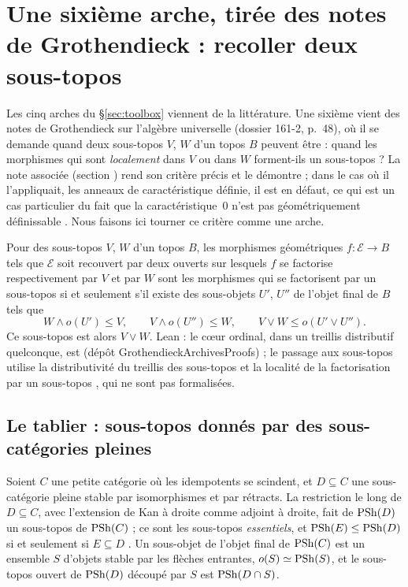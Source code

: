\section{Une sixième arche, tirée des notes de Grothendieck : recoller deux sous-topos}\label{sec:gluing}

Les cinq arches du \S\ref{sec:toolbox} viennent de la littérature. Une sixième vient des notes de Grothendieck sur l'algèbre universelle (dossier 161-2, p.~48), où il se demande quand deux sous-topos $V$, $W$ d'un topos $B$ peuvent être  : quand les morphismes qui sont \emph{localement} dans $V$ ou dans $W$ forment-ils un sous-topos ? La note associée \cite{bridges-notes} (section ) rend son critère précis et le démontre ; dans le cas où il l'appliquait, les anneaux de caractéristique définie, il est en défaut, ce qui est un cas particulier du fait que la caractéristique~$0$ n'est pas géométriquement définissable \cite[\S8.2]{caramello-flat}. Nous faisons ici tourner ce critère comme une arche.

\begin{bridge}[Recollement]\label{br:glue}
Pour des sous-topos $V$, $W$ d'un topos $B$, les morphismes géométriques $f\colon\mathcal E\to B$ tels que $\mathcal E$ soit recouvert par deux ouverts sur lesquels $f$ se factorise respectivement par $V$ et par $W$ sont les morphismes qui se factorisent par un sous-topos si et seulement s'il existe des sous-objets $U'$, $U''$ de l'objet final de $B$ tels que
\[
W\wedge o(U')\le V,\qquad V\wedge o(U'')\le W,\qquad V\vee W\le o(U'\vee U'').
\]
Ce sous-topos est alors $V\vee W$. Lean : le cœur ordinal, dans un treillis distributif quelconque, est  (dépôt GrothendieckArchivesProofs) ; le passage aux sous-topos utilise la distributivité du treillis des sous-topos et la localité de la factorisation par un sous-topos \cite[\S A4.5]{elephant}, qui ne sont pas formalisées.
\end{bridge}

\subsection{Le tablier : sous-topos donnés par des sous-catégories pleines}

Soient $C$ une petite catégorie où les idempotents se scindent, et $D\subseteq C$ une sous-catégorie pleine stable par isomorphismes et par rétracts. La restriction le long de $D\subseteq C$, avec l'extension de Kan à droite comme adjoint à droite, fait de $\mathrm{PSh}(D)$ un sous-topos de $\mathrm{PSh}(C)$ ; ce sont les sous-topos \emph{essentiels}, et $\mathrm{PSh}(E)\le\mathrm{PSh}(D)$ si et seulement si $E\subseteq D$ \cite{kelly-lawvere}. Un sous-objet de l'objet final de $\mathrm{PSh}(C)$ est un ensemble $S$ d'objets stable par les flèches entrantes, $o(S)\simeq\mathrm{PSh}(S)$, et le sous-topos ouvert de $\mathrm{PSh}(D)$ découpé par $S$ est $\mathrm{PSh}(D\cap S)$.

